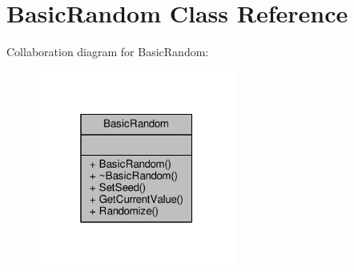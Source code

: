 \hypertarget{classBasicRandom}{}\section{Basic\+Random Class Reference}
\label{classBasicRandom}


Collaboration diagram for Basic\+Random\+:
\nopagebreak
\begin{figure}[H]
\begin{center}
\leavevmode
\includegraphics[width=184pt]{d7/d54/classBasicRandom__coll__graph}
\end{center}
\end{figure}
